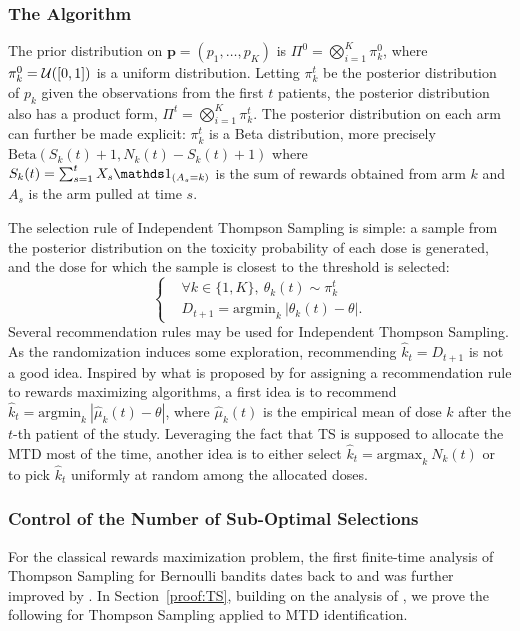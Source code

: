 \subsubsection{The Algorithm}

The prior distribution on $\bm{p} = (p_1,\dots,p_K)$ is $\Pi^0 = \bigotimes_{i=1}^{K} \pi_k^0$, where $\pi_k^0 = \mathcal{U}([0,1])$ is a uniform distribution. Letting $\pi_k^t$ be the posterior distribution of $p_k$ given the observations from the first $t$ patients, the posterior distribution also has a product form, $\Pi^t =\bigotimes_{i=1}^{K} \pi_k^t$. The posterior distribution on each arm can further be made explicit: $\pi_k^t$ is a Beta distribution, more precisely $\text{Beta}(S_k(t) + 1, N_k(t) - S_k(t)+1)$ where $S_k(t) = \sum_{s=1}^t X_s \ind_{(A_s = k)}$ is the sum of rewards obtained from arm $k$ and $A_s$ is the arm pulled at time $s$. 

The selection rule of Independent Thompson Sampling is simple: a sample from the posterior distribution on the toxicity probability of each dose is generated, and the dose for which the sample is closest to the threshold is selected: 
\[\left\{\begin{array}{cl}
& \forall k \in \{1,K\}, \  \theta_k(t) \sim \pi_k^t \\
& D_{t+1} = \text{argmin}_{k} \ |\theta_k(t) - \theta|.
\end{array}\right.\]
Several recommendation rules may be used for Independent Thompson Sampling. As the randomization induces some exploration, recommending $\hat{k}_t = D_{t+1}$ is not a good idea. Inspired by what is proposed by 
\cite{Bubeckal11} for assigning a recommendation rule to rewards maximizing algorithms, a first idea is to recommend $\hat{k}_t= \text{argmin}_{k} \ |\hat{\mu}_k(t) - \theta|$, where $\hat{\mu}_k(t)$ is the empirical mean of dose $k$ after the $t$-th patient of the study. Leveraging the fact that TS is supposed to allocate the MTD most of the time, another idea  is to either select $\hat{k}_t= \text{argmax}_{k} \ N_k(t)$ or to pick $\hat{k}_t$ uniformly at random among the allocated doses.


\subsubsection{Control of the Number of Sub-Optimal Selections}

For the classical rewards maximization problem, the first finite-time analysis of Thompson Sampling for Bernoulli bandits dates back to \cite{AGCOLT12} and was further improved by \cite{ALT12,AGAISTAT13}. 
In Section~\ref{proof:TS}, building on the analysis of \cite{AGAISTAT13}, we prove the following for Thompson Sampling applied to MTD identification. 

